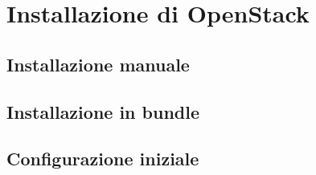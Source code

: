 \section{Installazione di OpenStack}

\subsection{Installazione manuale}

\subsection{Installazione in bundle}

\subsection{Configurazione iniziale}